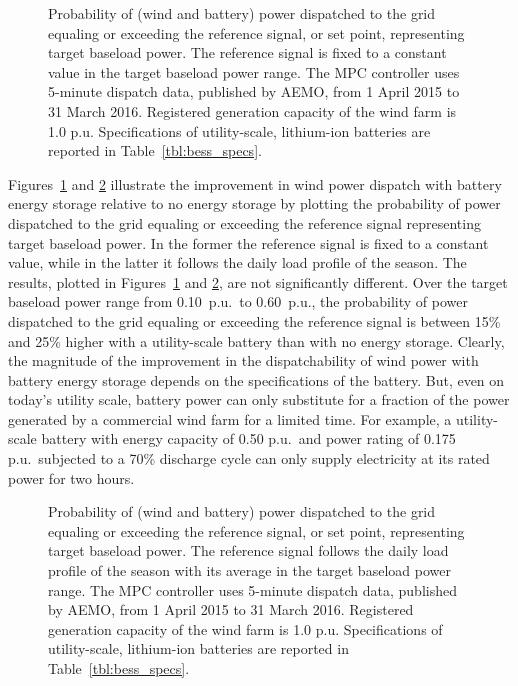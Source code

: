 \begin{figure}[!t]
	\centering
	\caption[Dispatchability of wind power with battery energy storage --- set point is fixed to a constant value]{Probability of (wind and battery) power dispatched to the grid equaling or exceeding the reference signal, or set point, representing target baseload power.  The reference signal is fixed to a constant value in the target baseload power range.  The MPC controller uses 5-minute dispatch data, published by AEMO, from 1 April 2015 to 31 March 2016.  Registered generation capacity of the wind farm is 1.0 p.u.  Specifications of utility-scale, lithium-ion batteries are reported in Table~\ref{tbl:bess_specs}.} 
	\label{fig:disp_wind_bess_flat}
	\scalebox{0.90}{
		
	}
\end{figure}

Figures~\ref{fig:disp_wind_bess_flat} and \ref{fig:disp_wind_bess_load_prof} illustrate the improvement in wind power dispatch with battery energy storage relative to no energy storage by plotting the probability of power dispatched to the grid equaling or exceeding the reference signal representing target baseload power.  In the former the reference signal is fixed to a constant value, while in the latter it follows the daily load profile of the season.  The results, plotted in Figures~\ref{fig:disp_wind_bess_flat} and \ref{fig:disp_wind_bess_load_prof}, are not significantly different.  Over the target baseload power range from 0.10~p.u.\ to 0.60~p.u., the probability of power dispatched to the grid equaling or exceeding the reference signal is between 15\% and 25\% higher with a utility-scale battery than with no energy storage.  Clearly, the magnitude of the improvement in the dispatchability of wind power with battery energy storage depends on the specifications of the battery.  But, even on today's utility scale, battery power can only substitute for a fraction of the power generated by a commercial wind farm for a limited time.  For example, a utility-scale battery with energy capacity of 0.50 p.u.\ and power rating of 0.175 p.u.\ subjected to a 70\% discharge cycle can only supply electricity at its rated power for two hours.

\begin{figure}[!t]
	\centering
	\caption[Dispatchability of wind power with battery energy storage --- set point follows the daily load profile of the season]{Probability of (wind and battery) power dispatched to the grid equaling or exceeding the reference signal, or set point, representing target baseload power.  The reference signal follows the daily load profile of the season with its average in the target baseload power range. The MPC controller uses 5-minute dispatch data, published by AEMO, from 1 April 2015 to 31 March 2016.  Registered generation capacity of the wind farm is 1.0 p.u.  Specifications of utility-scale, lithium-ion batteries are reported in Table~\ref{tbl:bess_specs}.} 
	\label{fig:disp_wind_bess_load_prof}
	\scalebox{0.90}{
		
	}
\end{figure}

